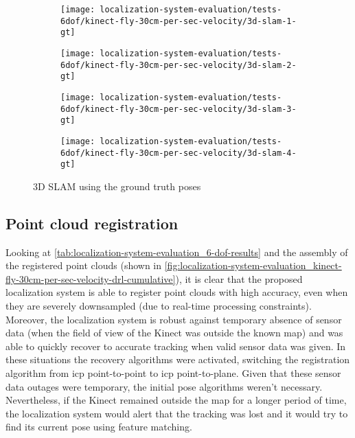 \begin{figure}[H]
	\centering
	\begin{subfigure}[ht]{0.45\textwidth}
		\centering
		\texttt{[image: localization-system-evaluation/tests-6dof/kinect-fly-30cm-per-sec-velocity/3d-slam-1-gt]}
	\end{subfigure}
	\begin{subfigure}[ht]{0.45\textwidth}
		\centering
		\texttt{[image: localization-system-evaluation/tests-6dof/kinect-fly-30cm-per-sec-velocity/3d-slam-2-gt]}
	\end{subfigure}
	\begin{subfigure}[ht]{0.45\textwidth}
		\centering
		\texttt{[image: localization-system-evaluation/tests-6dof/kinect-fly-30cm-per-sec-velocity/3d-slam-3-gt]}
	\end{subfigure}
	\begin{subfigure}[ht]{0.45\textwidth}
		\centering
		\texttt{[image: localization-system-evaluation/tests-6dof/kinect-fly-30cm-per-sec-velocity/3d-slam-4-gt]}
	\end{subfigure}
	\caption{3D SLAM using the ground truth poses}
	\label{fig:localization-system-evaluation_kinect-fly-30cm-per-sec-velocity-gt-slam}
\end{figure}


\subsection{Point cloud registration}

Looking at \cref{tab:localization-system-evaluation_6-dof-results} and the assembly of the registered point clouds (shown in \cref{fig:localization-system-evaluation_kinect-fly-30cm-per-sec-velocity-drl-cumulative}), it is clear that the proposed localization system is able to register point clouds with high accuracy, even when they are severely downsampled (due to real-time processing constraints). Moreover, the localization system is robust against temporary absence of sensor data (when the field of view of the Kinect was outside the known map) and was able to quickly recover to accurate tracking when valid sensor data was given. In these situations the recovery algorithms were activated, switching the registration algorithm from \gls{icp} point-to-point to \gls{icp} point-to-plane. Given that these sensor data outages were temporary, the initial pose algorithms weren't necessary. Nevertheless, if the Kinect remained outside the map for a longer period of time, the localization system would alert that the tracking was lost and it would try to find its current pose using feature matching.

